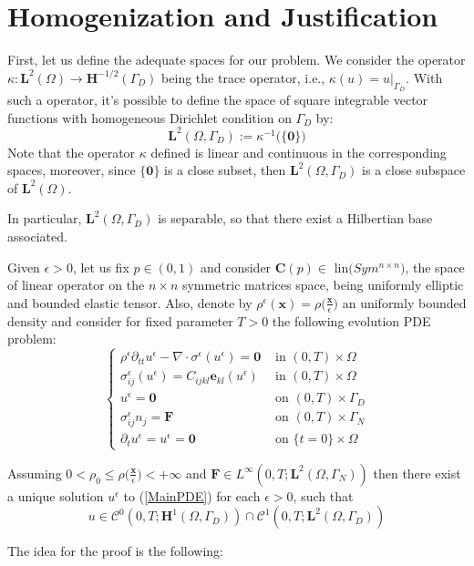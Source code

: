 \chapter{Homogenization and Justification}
First, let us define the adequate spaces for our problem. We consider the operator $\kappa: \mathbf{L}^2( \Omega) \longrightarrow \mathbf{H}^{-1/2}(\Gamma_D)$ being the trace operator, i.e., $\kappa (u) = u \vert_{\Gamma_D}$. With such a operator, it's possible to define the space of square integrable vector functions with homogeneous Dirichlet condition on $\Gamma_D$ by:
\begin{equation*}
    \mathbf{L}^2(\Omega, \Gamma_D) := \kappa^{-1}\big( \{ \mathbf{0}\}\big)
\end{equation*}
Note that the operator $\kappa$ defined is linear and continuous in the corresponding spaces, moreover, since $\{\mathbf{0}\}$ is a close subset, then $\mathbf{L}^2(\Omega, \Gamma_D)$ is a close subspace of $\mathbf{L}^2(\Omega)$.
\begin{rem}
In particular, $\mathbf{L}^2(\Omega, \Gamma_D)$ is separable, so that there exist a Hilbertian base associated.
\end{rem}
Given $\epsilon > 0$, let us fix $p \in (0,1)$ and consider $\mathbf{C}(p) \in \text{ lin}\big(Sym^{n\times n})$, the space of linear operator on the $n\times n$ symmetric matrices space, being uniformly elliptic and bounded elastic tensor. Also, denote by $\rho^{\epsilon}(\mathbf{x}) = \rho \big( \frac{\mathbf{x}}{\epsilon}\big)$ an uniformly bounded density and consider for fixed parameter $T > 0$ the following evolution PDE problem:
\begin{equation}
    \label{MainPDE}
    \left \{
    \begin{array}{cc}
        \rho^{\epsilon} \partial_{tt} u^{\epsilon} - \nabla\cdot \sigma^{\epsilon}(u^{\epsilon})= \mathbf{0} & \text{ in } (0,T) \times \Omega \\
        \sigma^{\epsilon}_{ij}(u^{\epsilon}) = C_{ijkl} \mathbf{e}_{kl}(u^{\epsilon}) & \text{ in } (0,T)\times \Omega \\
        u^{\epsilon} = \mathbf{0} & \text{ on } (0,T) \times \Gamma_D \\
        \sigma^{\epsilon}_{ij} n_j = \mathbf{F} & \text{ on } (0,T) \times \Gamma_N \\
        \partial_t u^{\epsilon} = u^{\epsilon} = \mathbf{0} & \text{ on } \{t=0\} \times \Omega
    \end{array}
    \right.
\end{equation}
\begin{prop}
Assuming $0 < \rho_0 \leq \rho\big( \frac{\mathbf{x}}{\epsilon} \big) < + \infty$ and $\mathbf{F} \in L^{\infty}(0,T;\mathbf{L}^2(\Omega,\Gamma_N))$ then there exist a unique solution $u^{\epsilon}$ to (\ref{MainPDE}) for each $\epsilon > 0$, such that
\begin{equation*}
    u \in \mathcal{C}^0(0,T;\mathbf{H}^1(\Omega,\Gamma_D)) \cap \mathcal{C}^1(0,T;\mathbf{L}^2(\Omega, \Gamma_D))
\end{equation*}
\end{prop}
The idea for the proof is the following:\\

